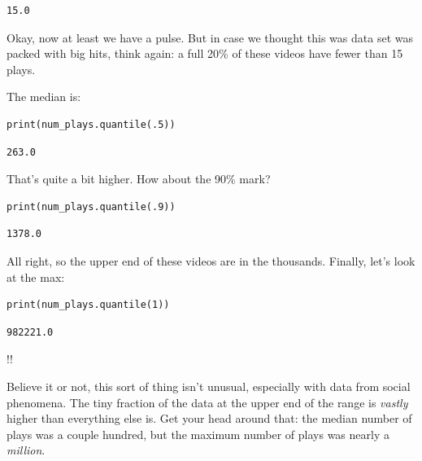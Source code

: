\begin{Verbatim}[fontsize=\small,samepage=true,frame=leftline,framesep=5mm,framerule=1mm]
15.0
\end{Verbatim}

Okay, now at least we have a pulse. But in case we thought this was data set
was packed with big hits, think again: a full 20\% of these videos have fewer
than 15 plays.

The median is:

\begin{Verbatim}[fontsize=\small,samepage=true,frame=single,framesep=3mm]
print(num_plays.quantile(.5))
\end{Verbatim}
\vspace{-.3in}

\begin{Verbatim}[fontsize=\small,samepage=true,frame=leftline,framesep=5mm,framerule=1mm]
263.0
\end{Verbatim}

That's quite a bit higher. How about the 90\% mark?

\begin{Verbatim}[fontsize=\small,samepage=true,frame=single,framesep=3mm]
print(num_plays.quantile(.9))
\end{Verbatim}
\vspace{-.3in}

\begin{Verbatim}[fontsize=\small,samepage=true,frame=leftline,framesep=5mm,framerule=1mm]
1378.0
\end{Verbatim}

All right, so the upper end of these videos are in the thousands. Finally,
let's look at the max:

\begin{Verbatim}[fontsize=\small,samepage=true,frame=single,framesep=3mm]
print(num_plays.quantile(1))
\end{Verbatim}
\vspace{-.3in}

\begin{Verbatim}[fontsize=\small,samepage=true,frame=leftline,framesep=5mm,framerule=1mm]
982221.0
\end{Verbatim}

!!

Believe it or not, this sort of thing isn't unusual, especially with data from
social phenomena. The tiny fraction of the data at the upper end of the range
is \textit{vastly} higher than everything else is. Get your head around that:
the median number of plays was a couple hundred, but the maximum number of
plays was nearly a \textit{million}.

